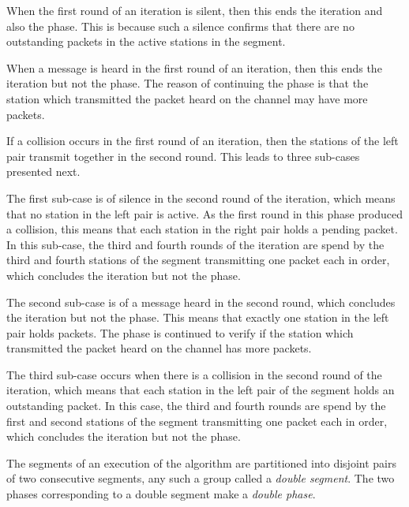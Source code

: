\documentclass[11pt]{article}
\begin{document}
When the first round of an iteration is silent, then this ends the iteration and also the phase.
This is because such a silence confirms that there are no outstanding packets in the active stations  in the segment.

When a message is heard in the first round of an iteration, then this ends the iteration but not the phase.
The reason of continuing the phase is that the station which transmitted the packet heard on the channel may have more packets.

If a collision occurs in the first round of an iteration, then the stations of the left pair transmit together in the second round.
This leads to three sub-cases presented next.

The first sub-case is of silence in the second round of the iteration, which means that no station in the left pair is active.
As the first round in this phase  produced a collision, this means that each station in the right pair holds a pending packet.
In this sub-case, the third and fourth rounds of the iteration are spend by the third and fourth stations of the segment transmitting one packet each in order, which concludes the iteration but not the phase.

The second sub-case is of a message heard in the second round, which concludes the iteration but not the phase.
This means that exactly one station in the left pair holds packets.
The phase is continued to verify if the station which transmitted the packet heard on the channel has more packets.


The third sub-case occurs when there is a collision in the second round of the iteration, which means that each station in the left pair of the segment holds an outstanding packet.
In this case, the third and fourth rounds are spend by the first and second stations of the segment transmitting one packet each in order, which concludes the iteration but not the phase.


The segments of an execution of the algorithm are partitioned into disjoint pairs of two consecutive segments, any such a group called a \emph{double segment}.
The two phases corresponding to a double segment make a \emph{double phase}.




\newlength{\examplewidth}
\setlength{\examplewidth}{\textwidth}
\addtolength{\examplewidth}{-20em}
\end{document}
